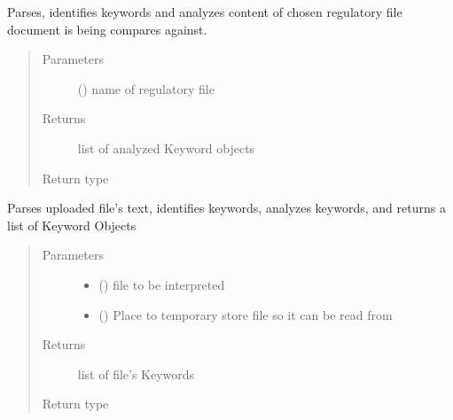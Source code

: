 \documentclass[letterpaper,10pt,english]{sphinxmanual}
\begin{document}

\begin{fulllineitems}
\label{\detokenize{functionsv1:common_functions.interpretexistingfile}}
Parses, identifies keywords and analyzes content of chosen regulatory file document is being compares against.
\begin{quote}\begin{description}
\item[{Parameters}] \leavevmode
{} () \textendash{} name of regulatory file

\item[{Returns}] \leavevmode
list of analyzed Keyword objects

\item[{Return type}] \leavevmode
{\hyperref[\detokenize{KeywordList:module-KeywordList}]{}}

\end{description}\end{quote}

\end{fulllineitems}


\begin{fulllineitems}
\label{\detokenize{functionsv1:common_functions.interpretfile}}
Parses uploaded file’s text, identifies keywords, analyzes keywords, and returns a list of Keyword Objects
\begin{quote}\begin{description}
\item[{Parameters}] \leavevmode\begin{itemize}
\item {} 
 () \textendash{} file to be interpreted

\item {} 
 () \textendash{} Place to temporary store file so it can be read from

\end{itemize}

\item[{Returns}] \leavevmode
list of file’s Keywords

\item[{Return type}] \leavevmode
{\hyperref[\detokenize{KeywordList:module-KeywordList}]{}}

\end{description}\end{quote}

\end{fulllineitems}
\end{document}
